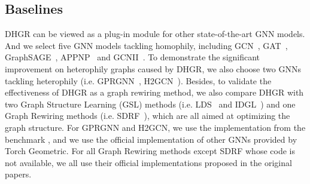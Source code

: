 \documentclass[sigconf]{acmart}
\begin{document}
	\subsection{Baselines}
	DHGR can be viewed as a plug-in module for other state-of-the-art GNN models. And we select five GNN models tackling  homophily, including GCN~\cite{GCN}, GAT~\cite{GAT}, GraphSAGE~\cite{GraphSAGE}, APPNP~\cite{APPNP} and GCNII~\cite{GCN2}. To demonstrate the significant improvement on heterophily graphs caused by DHGR, we also choose two GNNs tackling heterophily (i.e. GPRGNN~\cite{chien2020adaptive}, H2GCN~\cite{h2gcn}). Besides, to validate the effectiveness of DHGR as a graph rewiring method, we also compare DHGR with two Graph Structure Learning (GSL) methods (i.e. LDS~\cite{LDS} and IDGL~\cite{chen2020iterative}) and one Graph Rewiring methods (i.e. SDRF~\cite{topping2021understanding}), which are all aimed at optimizing the graph structure. For GPRGNN and H2GCN, we use the implementation from the benchmark \cite{lim2021new}, and we use the official implementation of other GNNs provided by Torch Geometric. For all Graph Rewiring methods except SDRF whose code is not available, we all use their official implementations proposed in the original papers.
	
\end{document}
